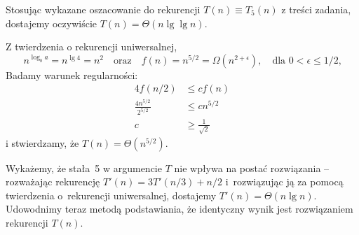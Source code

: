 % 

Stosując wykazane oszacowanie do rekurencji $T(n)\equiv T_5(n)$ z treści zadania, dostajemy oczywiście $T(n)=\Theta(n\lg\lg n)$.

\subproblem %
Z twierdzenia o rekurencji uniwersalnej,
\[
	n^{\log_ba} = n^{\lg4} = n^2 \quad\text{oraz}\quad f(n) = n^{5/2} = \Omega(n^{2+\epsilon}), \quad\text{dla $0<\epsilon\le1/2$,}
\]
Badamy warunek regularności:
\begin{align*}
	4f(n/2) &\le cf(n) \\
	\frac{4n^{5/2}}{2^{5/2}} &\le cn^{5/2} \\
	c &\ge \frac{1}{\sqrt{2}}
\end{align*}
i stwierdzamy, że $T(n)=\Theta(n^{5/2})$.

\subproblem %
Wykażemy, że stała~5 w argumencie $T$ nie wpływa na postać rozwiązania -- rozważając rekurencję $T'(n)=3T'(n/3)+n/2$ i~rozwiązując ją za pomocą twierdzenia o~rekurencji uniwersalnej, dostajemy $T'(n)=\Theta(n\lg n)$. Udowodnimy teraz metodą podstawiania, że identyczny wynik jest rozwiązaniem rekurencji $T(n)$.


